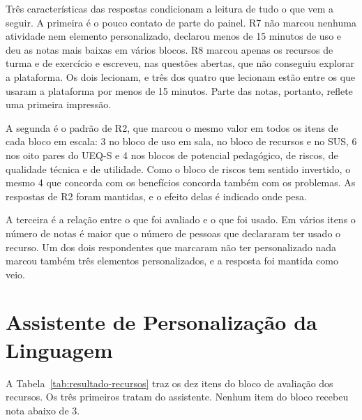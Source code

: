Três características das respostas condicionam a leitura de tudo o que vem a seguir. A primeira é o pouco contato de parte do painel. R7 não marcou nenhuma atividade nem elemento personalizado, declarou menos de 15 minutos de uso e deu as notas mais baixas em vários blocos. R8 marcou apenas os recursos de turma e de exercício e escreveu, nas questões abertas, que não conseguiu explorar a plataforma. Os dois lecionam, e três dos quatro que lecionam estão entre os que usaram a plataforma por menos de 15 minutos. Parte das notas, portanto, reflete uma primeira impressão.

A segunda é o padrão de R2, que marcou o mesmo valor em todos os itens de cada bloco em escala: 3 no bloco de uso em sala, no bloco de recursos e no SUS, 6 nos oito pares do UEQ-S e 4 nos blocos de potencial pedagógico, de riscos, de qualidade técnica e de utilidade. Como o bloco de riscos tem sentido invertido, o mesmo 4 que concorda com os benefícios concorda também com os problemas. As respostas de R2 foram mantidas, e o efeito delas é indicado onde pesa.

A terceira é a relação entre o que foi avaliado e o que foi usado. Em vários itens o número de notas é maior que o número de pessoas que declararam ter usado o recurso. Um dos dois respondentes que marcaram não ter personalizado nada marcou também três elementos personalizados, e a resposta foi mantida como veio.

\section{Assistente de Personalização da Linguagem}
\label{sec:resultado-assistente}

A Tabela~\ref{tab:resultado-recursos} traz os dez itens do bloco de avaliação dos recursos. Os três primeiros tratam do assistente. Nenhum item do bloco recebeu nota abaixo de 3.

